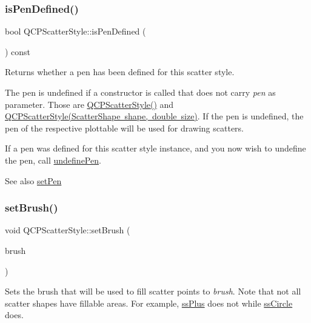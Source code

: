 \subsubsection{\texorpdfstring{is\+Pen\+Defined()}{isPenDefined()}}
{\footnotesize\ttfamily bool Q\+C\+P\+Scatter\+Style\+::is\+Pen\+Defined (\begin{DoxyParamCaption}{ }\end{DoxyParamCaption}) const\hspace{0.3cm}{\ttfamily [inline]}}

Returns whether a pen has been defined for this scatter style.

The pen is undefined if a constructor is called that does not carry {\itshape pen} as parameter. Those are \mbox{\hyperlink{class_q_c_p_scatter_style_a8836018d9ad83ccd8870de8315c1be73}{Q\+C\+P\+Scatter\+Style()}} and \mbox{\hyperlink{class_q_c_p_scatter_style_a003d92f74f4561eda111862eadd62f28}{Q\+C\+P\+Scatter\+Style(\+Scatter\+Shape shape, double size)}}. If the pen is undefined, the pen of the respective plottable will be used for drawing scatters.

If a pen was defined for this scatter style instance, and you now wish to undefine the pen, call \mbox{\hyperlink{class_q_c_p_scatter_style_acabc2a8c83d650b946f50c3166b6c35e}{undefine\+Pen}}.

\begin{DoxySeeAlso}{See also}
\mbox{\hyperlink{class_q_c_p_scatter_style_a761f1f229cc0ca4703e1e2b89f6dd1ba}{set\+Pen}} 
\end{DoxySeeAlso}
\mbox{\label{class_q_c_p_scatter_style_a74d692aaeb8d4b36d6f7d510e44264b1}} 
\subsubsection{\texorpdfstring{set\+Brush()}{setBrush()}}
{\footnotesize\ttfamily void Q\+C\+P\+Scatter\+Style\+::set\+Brush (\begin{DoxyParamCaption}\item[{const Q\+Brush \&}]{brush }\end{DoxyParamCaption})}

Sets the brush that will be used to fill scatter points to {\itshape brush}. Note that not all scatter shapes have fillable areas. For example, \mbox{\hyperlink{class_q_c_p_scatter_style_adb31525af6b680e6f1b7472e43859349a2d7f1d3c1a148b9d9d17f2fd9cae5eb7}{ss\+Plus}} does not while \mbox{\hyperlink{class_q_c_p_scatter_style_adb31525af6b680e6f1b7472e43859349a7c92a110880d0ef2170dff3a5b4f7779}{ss\+Circle}} does.

